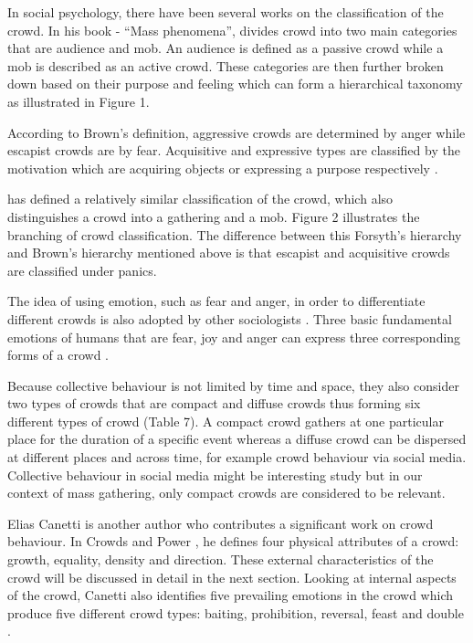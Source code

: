 In social psychology, there have been several works on the classification of the crowd. In his book - ``Mass phenomena'', \citet{Brown1954} divides crowd into two main categories that are audience and mob. An audience is defined as a passive crowd while a mob is described as an active crowd. These categories are then further broken down based on their purpose and feeling \citep{Pelechano2008} which can form a hierarchical taxonomy as illustrated in Figure 1.

According to Brown’s definition, aggressive crowds are determined by anger while escapist crowds are by fear. Acquisitive and expressive types are classified by the motivation which are acquiring objects or expressing a purpose respectively \citep{Durupinar2010}.

\citet{Forsyth2009} has defined a relatively similar classification of the crowd, which also distinguishes a crowd into a gathering and a mob. Figure 2 illustrates the branching of crowd classification. The difference between this Forsyth’s hierarchy and Brown’s hierarchy mentioned above is that escapist and acquisitive crowds are classified under panics. 

The idea of using emotion, such as fear and anger, in order to differentiate different crowds is also adopted by other sociologists \citep{Lofland1985,Smelser1998}. Three basic fundamental emotions of humans that are fear, joy and anger can express three corresponding forms of a crowd \citep{Imhonopi2013}.

Because collective behaviour is not limited by time and space, they also consider two types of crowds that are compact and diffuse crowds thus forming six different types of crowd (Table 7). A compact crowd gathers at one particular place for the duration of a specific event whereas a diffuse crowd can be dispersed at different places and across time, for example crowd behaviour via social media. Collective behaviour in social media might be interesting study but in our context of mass gathering, only compact crowds are considered to be relevant.

Elias Canetti is another author who contributes a significant work on crowd behaviour. In Crowds and Power \citep{Canetti1962}, he defines four physical attributes of a crowd: growth, equality, density and direction. These external characteristics of the crowd will be discussed in detail in the next section. Looking at internal aspects of the crowd, Canetti also identifies five prevailing emotions in the crowd which produce five different crowd types: baiting, prohibition, reversal, feast and double \citep{McClelland2010}.

